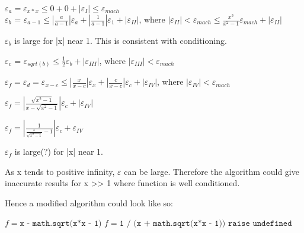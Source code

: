 \begin{example}
\begin{enumerate}
              $\varepsilon_a = \varepsilon_{x*x} \le 0 + 0 + |\varepsilon_I| \le \varepsilon_{mach}$ \\

              $\varepsilon_b$ = $\varepsilon_{a-1} \le \left| \frac{a}{a-1} \right| \varepsilon_a + \left| \frac{1}{a-1} \right| \varepsilon_1 + |\varepsilon_{II}|$, where $|\varepsilon_{II}| < \varepsilon_{mach} \le \frac{x^2}{x^2 - 1} \varepsilon_{mach} + |\varepsilon_{II}|$

              $\varepsilon_b$ is large for |x| near 1. This is consistent with conditioning.

              $\varepsilon_c$ = $\varepsilon_{sqrt(b)} \le \frac{1}{2} \varepsilon_b + |\varepsilon_{III}|$, where \( |\varepsilon_{III}| < \varepsilon_{mach} \)

              \( \varepsilon_f = \varepsilon_d = \varepsilon_{x - c} \le \left| \frac{x}{x - c} \right| \varepsilon_x + \left| \frac{c}{x - c} \right| \varepsilon_c + |\varepsilon_{IV}| \), where \( |\varepsilon_{IV}| < \varepsilon_{mach} \)

              \( \varepsilon_f = \left| \frac{\sqrt{x^2 - 1}}{x - \sqrt{x^2 - 1}} \right| \varepsilon_c + |\varepsilon_{IV}| \)

              \( \varepsilon_f = \left| \frac{1}{\frac{x}{\sqrt{x^2 - 1}} - 1} \right| \varepsilon_c + \varepsilon_{IV} \)

              \( \varepsilon_f \) is large(?) for |x| near 1.

              As x tends to positive infinity, \( \varepsilon \) can be large. Therefore the algorithm could give inaccurate results for x >> 1 where function is well conditioned.

              Hence a modified algorithm could look like so:
              \begin{algorithm}[H]
                  \begin{algorithmic}
                      \State \( f = \texttt{x - math.sqrt(x*x - 1)} \)
                      \State \( f = \texttt{1 / (x + math.sqrt(x*x - 1))} \)
                      \Else
                      \State \(\texttt{raise undefined} \)
                      \EndIf
                      \EndFunction
                  \end{algorithmic}
              \end{algorithm}
    \end{enumerate}
\end{example}